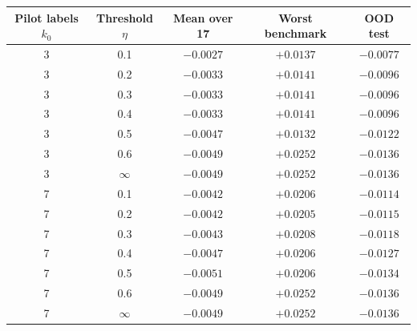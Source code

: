 \begin{tabular}{ccccc}
\toprule
Pilot labels $k_0$ & Threshold $\eta$ & Mean over 17 & Worst benchmark & OOD test \\
\midrule
3 & 0.1 & $\minus0.0027$ & $+0.0137$ & $\minus0.0077$ \\
3 & 0.2 & $\minus0.0033$ & $+0.0141$ & $\minus0.0096$ \\
3 & 0.3 & $\minus0.0033$ & $+0.0141$ & $\minus0.0096$ \\
3 & 0.4 & $\minus0.0033$ & $+0.0141$ & $\minus0.0096$ \\
3 & 0.5 & $\minus0.0047$ & $+0.0132$ & $\minus0.0122$ \\
3 & 0.6 & $\minus0.0049$ & $+0.0252$ & $\minus0.0136$ \\
3 & $\infty$ & $\minus0.0049$ & $+0.0252$ & $\minus0.0136$ \\
7 & 0.1 & $\minus0.0042$ & $+0.0206$ & $\minus0.0114$ \\
7 & 0.2 & $\minus0.0042$ & $+0.0205$ & $\minus0.0115$ \\
7 & 0.3 & $\minus0.0043$ & $+0.0208$ & $\minus0.0118$ \\
7 & 0.4 & $\minus0.0047$ & $+0.0206$ & $\minus0.0127$ \\
7 & 0.5 & $\minus0.0051$ & $+0.0206$ & $\minus0.0134$ \\
7 & 0.6 & $\minus0.0049$ & $+0.0252$ & $\minus0.0136$ \\
7 & $\infty$ & $\minus0.0049$ & $+0.0252$ & $\minus0.0136$ \\
\bottomrule
\end{tabular}
